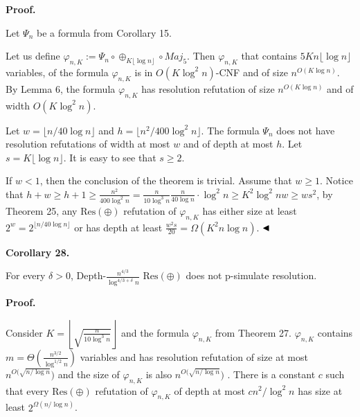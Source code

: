 \documentclass[10pt,a4paper]{article}
\begin{document}
\par\medskip\noindent\textbf{Proof.}\par


Let $\Psi_{n}$ be a formula from Corollary 15.\par



Let us define $\varphi_{n,K}:=\Psi_{n}\circ\oplus_{K\lfloor\log n\rfloor}\circ Maj_{5}$.
Then $\varphi_{n,K}$ that contains $5Kn\lfloor\log n\rfloor$ variables, of the formula
$\varphi_{n,K}$ is in $O(K\log^{2}n)$-CNF and of size $n^{O(K\log n)}$.
By Lemma 6, the formula $\varphi_{n,K}$ has resolution refutation of size $n^{O(K\log n)}$ and of width $O(K\log^{2}n)$.\par



Let $w=\lfloor n/40\log n\rfloor$ and $h=\lfloor n^{2}/400\log^{2}n\rfloor$.
The formula $\Psi_{n}$ does not have resolution refutations of width at most $w$ and of depth at most $h$.
Let $s=K\lfloor\log n\rfloor$. It is easy to see that $s\geq 2$.\par



If $w<1$, then the conclusion of the theorem is trivial. Assume that $w\geq 1$.
Notice that $h+w\geq h+1\geq\frac{n^{2}}{400\log^{2}n}=\frac{n}{10\log^{3}n}\frac{n}{40\log
n}\cdot\log^{2}n\geq K^{2}\log^{2}nw\geq ws^{2}$, by Theorem 25, any $\mathrm{Res}(\oplus)$ refutation of $\varphi_{n,K}$ has either
size at least $2^{w}=2^{\lfloor n/40\log n\rfloor}$ or has depth at least $\frac{w^{2}s}{20}=\Omega(K^{2}n\log n)$.
$\hfill\blacktriangleleft$\par



\par\medskip\noindent\textbf{
Corollary 28.
}\par



For every $\delta>0$,
Depth-$\frac{n^{4/3}}{\log^{4/3+\delta}n}$ $\mathrm{Res}(\oplus)$ does not p-simulate resolution.\par



\par\medskip\noindent\textbf{Proof.}\par


Consider $K=\left\lfloor\sqrt{\frac{n}{10\log^{3}n}}\right\rfloor$ and the formula $\varphi_{n,K}$ from Theorem 27.
$\varphi_{n,K}$ contains
$m=\Theta\left(\frac{n^{3/2}}{\log^{1/2}n}\right)$ variables and
has resolution refutation of size at most $n^{O(\sqrt{n/\log n}})$ and the size of $\varphi_{n,K}$ is also $n^{O(\sqrt{n/\log n}})$ .
There is a constant $c$ such that every $\mathrm{Res}(\oplus)$ refutation of $\varphi_{n,K}$ of depth at most $cn^{2}/\log^{2}n$ has size at least $2^{\Omega\left(n/\log n\right)}$.\par
\end{document}
